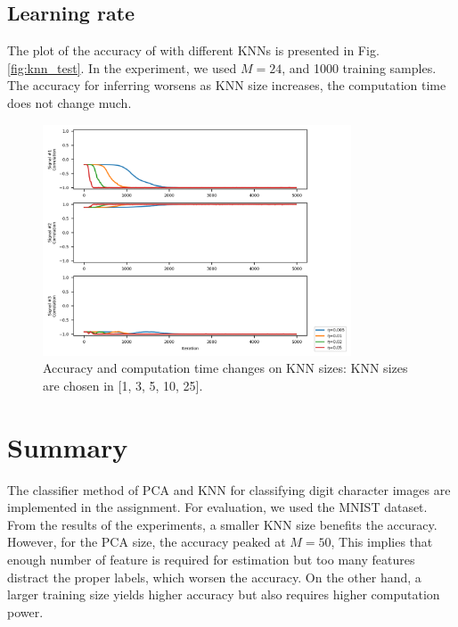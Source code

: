 \documentclass[conference]{IEEEtran}
\begin{document}
\subsection{Learning rate}

The plot of the accuracy of with different KNNs is presented in Fig. \ref{fig:knn_test}.
In the experiment, we used $M=24$, and 1000 training samples.
The accuracy for inferring worsens as KNN size increases, the computation time does not change much.

\begin{figure}[!t]
	\centering
	\includegraphics[width=3.6in]{source3/eta_test.png}	
	\caption{Accuracy and computation time changes on KNN sizes: KNN sizes are chosen in [1, 3, 5, 10, 25].}
	\label{fig:eta_test}
\end{figure}



\section{Summary} %
The classifier method of PCA and KNN for classifying digit character images are implemented in the assignment. For evaluation, we used the MNIST dataset. From the results of the experiments, a smaller KNN size benefits the accuracy. However, for the PCA size, the accuracy peaked at $M=50$, This implies that enough number of feature is required for estimation but too many features distract the proper labels, which worsen the accuracy. On the other hand, a larger training size yields higher accuracy but also requires higher computation power.







\end{document}
